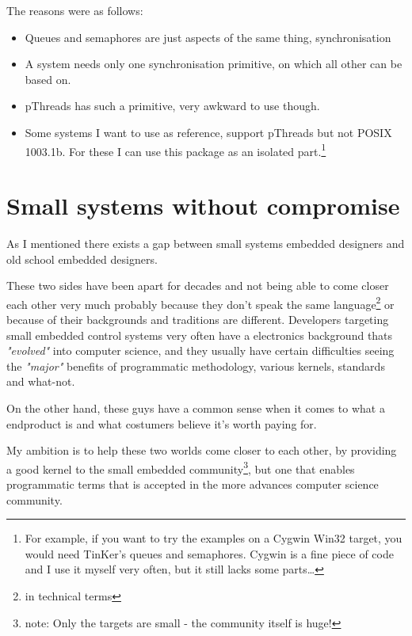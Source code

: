 The reasons were as follows:
\begin{itemize}
	\item Queues and semaphores are just aspects of the same thing, synchronisation
	\item A system needs only one synchronisation primitive, on which all other can be based on.
	\item pThreads has such a primitive, very awkward to use though.
	\item Some systems I want to use as reference, support pThreads but not POSIX 1003.1b. For these I can use this package as an isolated part.\footnote{For example, if you want to try the examples on a Cygwin Win32 target, you would need TinKer's queues and semaphores. Cygwin is a fine piece of code and I use it myself very often, but it still lacks some parts\ldots}
\end{itemize}


\chapter{Small systems without compromise}
As I mentioned there exists a gap between small systems embedded designers and old school embedded designers.

These two sides have been apart for decades and not being able to come closer each other very much probably because they don't speak the same language\footnote{in technical terms} or because of their backgrounds and traditions are different. Developers targeting small embedded control systems very often have a electronics background thats \textit{"evolved"} into computer science, and they usually have certain difficulties seeing the \textit{"major"} benefits of programmatic methodology, various kernels, standards and what-not.

On the other hand, these guys have a common sense when it comes to what a endproduct is and what costumers believe it's worth paying for.

My ambition is to help these two worlds come closer to each other, by providing a good kernel to the small embedded community\footnote{note: Only the targets are small - the community itself is huge!}, but one that enables programmatic terms that is accepted in the more advances computer science community.

